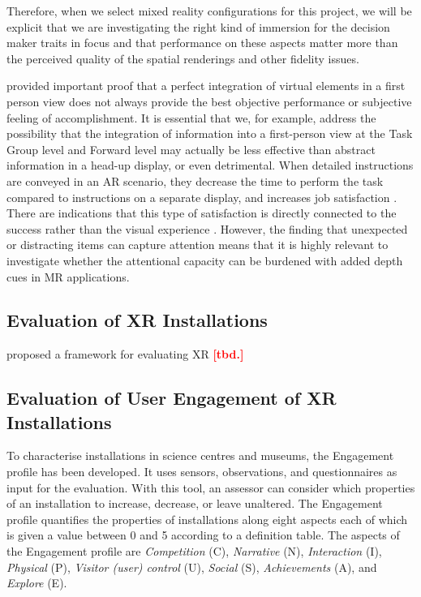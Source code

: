 \documentclass[11pt,english]{nik}
\newcommand{\EP}{Engagement profile\xspace}
\newcommand{\WVL}[1]{\textbf{\textcolor{red}{#1}}}
\begin{document}
Therefore, when we select mixed reality configurations for this project, we will be explicit that we are investigating the right kind of immersion for the decision maker traits in focus and that performance on these aspects matter more than the perceived quality of the spatial renderings and other fidelity issues.

\citet{Dima-2019} provided important proof that a perfect integration of virtual elements in a first person view does not always provide the best objective performance or subjective feeling of accomplishment. It is essential that we, for example, address the possibility that the integration of information into a first-person view at the Task Group level and Forward level may actually be less effective than abstract information in a head-up display, or even detrimental.
When detailed instructions are conveyed in an AR scenario, they decrease the time to perform the task compared to instructions on a separate display, and increases job satisfaction \autocite{Egger-Lampl-etal-2019}. There are indications that this type of satisfaction is directly connected to the success rather than the visual experience \autocite{Egger-Lampl-etal-2019,Sabet-etal-2019,martinettiReflectionsLimitedPervasiveness2019}.
However, the finding that unexpected or distracting items can capture attention \autocite{brockmoleShouldStayShould2009} means that it is highly relevant to investigate whether the attentional capacity can be burdened with added depth cues in MR applications.

\autocite{EGGER201935}

\subsection{Evaluation of XR Installations}

\citet{10.1145/3234253.3234306} proposed a framework for evaluating XR \WVL{[tbd.]}

\subsection{Evaluation of User Engagement of XR Installations}

To characterise installations in science centres and museums, the \EP \autocite{jLifSci16v8n12,aDesignProcess}
has been developed. 
It uses sensors, observations, and questionnaires as input for the evaluation.
With this tool, an assessor can consider which properties of an installation 
to increase, decrease, or leave unaltered. 
The \EP quantifies the properties of installations along eight
aspects each of which is given a value between 0 and 5 according to
a definition table. The aspects of the \EP are 
{\itshape Competition} (C), 
{\itshape Narrative} (N),
{\itshape Interaction} (I),
{\itshape Physical} (P), 
{\itshape Visitor (user) control} (U), 
{\itshape Social} (S),
{\itshape Achievements} (A),
and
{\itshape Explore} (E).
\end{document}
